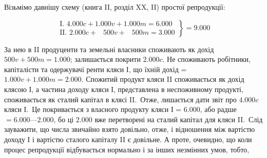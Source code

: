 Візьмімо давнішу схему (книга II, розділ XX, II) простої репродукції:

\begin{center}
\[
 \left.\begin{aligned}
        \text{I. }\num{4.000} c + \num{1.000} v + \num{1.000} m = \num{6.000}\\
        \text{II. }\num{2.000} c + \phantom{0.}500 v + \phantom{0.}500 m = \num{3.000}
       \end{aligned}
 \right\}
  = \num{9.000}
\]
\end{center}
За нею в II продуценти та земельні власники споживають як дохід
$500 v + 500 m = \num{1.000}$; залишається покрити $\num{2.000} c$. Не споживають
робітники, капіталісти та одержувачі ренти кляси І, що їхній дохід =
$\num{1.000} v + \num{1.000} m = \num{2.000}$. Спожитий продукт кляси II споживається як дохід
клясою І, а частина доходу кляси І, представлена в неспоживному продукті,
споживається як сталий капітал в клясі II.~Отже, лишається дати звіт про
$\num{4.000} c$ кляси І.~Це покривається з власного продукту кляси І = \num{6.000}, або радше
$= \num{6.000} — \num{2.000}$, бо ці \num{2.000} вже перетворені на сталий капітал для кляси II.~Слід
зауважити, що числа звичайно взято довільно, отже, і відношення між вартістю
доходу І і вартістю сталого капіталу II є довільне. А проте, очевидно, що коли
процес репродукції відбувається нормально і за інших незмінних умов, тобто,
\parbreak{}  %
